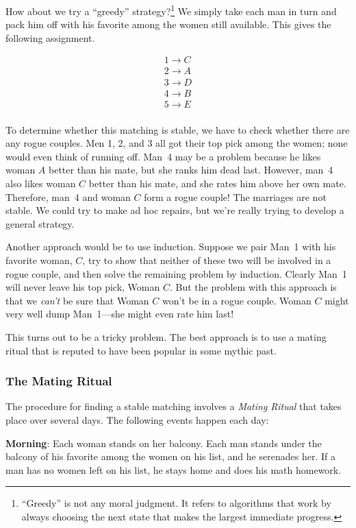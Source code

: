 How about we try a ``greedy'' strategy?\footnote{``Greedy'' is not any
moral judgment.  It refers to algorithms that work by always choosing the
next state that makes the largest immediate progress.}  We simply take
each man in turn and pack him off with his favorite among the women still
available.  This gives the following assignment.

\begin{eqnarray*}
1 \rightarrow C \\
2 \rightarrow A \\
3 \rightarrow D \\
4 \rightarrow B \\
5 \rightarrow E \\
\end{eqnarray*}

To determine whether this matching is stable, we have to check whether
there are any rogue couples.  Men 1, 2, and 3 all got their top pick
among the women; none would even think of running off.  Man~4 may be a
problem because he likes woman $A$ better than his mate, but she ranks him
dead last.  However, man~4 also likes woman $C$ better than his mate, and
she rates him above her own mate.  Therefore, man~4 and woman $C$ form a
rogue couple!  The marriages are not stable.  We could try to make ad hoc
repairs, but we're really trying to develop a general strategy.

Another approach would be to use induction.  Suppose we pair Man~1
with his favorite woman, $C$, try to show that neither of these two
will be involved in a rogue couple, and then solve the remaining
problem by induction.  Clearly Man~1 will never leave his top pick,
Woman $C$.  But the problem with this approach is that we \emph{can't}
be sure that Woman $C$ won't be in a rogue couple.  Woman $C$ might very
well dump Man~1---she might even rate him last!

This turns out to be a tricky problem.  The best approach is to use a
mating ritual that is reputed to have been popular in some mythic past.
\fi

\subsubsection{The Mating Ritual}

The procedure for finding a stable matching involves a \emph{Mating
Ritual} that takes place over several days.  The following events happen
each day:

\textbf{Morning}: Each woman stands on her balcony.  Each man stands
under the balcony of his favorite among the women on his list, and he
serenades her.  If a man has no women left on his list, he stays home
and does his math homework.

